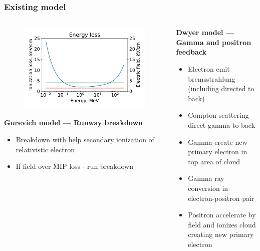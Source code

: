 \documentclass[8pt,pdf,hyperref={unicode}]{beamer}
\begin{document}
\begin{frame}
\frametitle{Existing model}
\begin{columns}
\begin{column}{0.5\textwidth}
    \begin{figure}[htb]
        \centering
        \includegraphics[width=1\columnwidth]{01_Gurevich.pdf}
    \end{figure}
    \textbf{Gurevich model --- Runway breakdown}
\begin{itemize}
    \item Breakdown with help secondary ionization of relativistic electron
    \item If field over MIP loss - run breakdown
\end{itemize}
\end{column}
\begin{column}{0.5\textwidth}
     \textbf{Dwyer model --- Gamma and positron feedback}
    \begin{itemize}
        \item Electron emit bremsstrahlung (including directed to back)
        \item Compton scattering direct gamma to back 
        \item Gamma create new primary electron in top area of cloud
        \item Gamma ray conversion in electron-positron pair
        \item Positron accelerate by field and ionizes cloud creating new primary electron
        
    \end{itemize}
\end{column}
\end{columns}

\end{frame}
\end{document}
